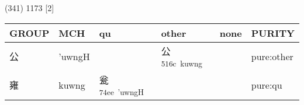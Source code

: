 \documentclass[14pt,a4paper]{scrartcl}
\begin{document}
(341) 1173 {[}2{]}

\begin{longtable}[c]{@{}llllll@{}}
\toprule
\begin{minipage}[b]{0.14\columnwidth}\raggedright\strut
GROUP
\strut\end{minipage} &
\begin{minipage}[b]{0.14\columnwidth}\raggedright\strut
MCH
\strut\end{minipage} &
\begin{minipage}[b]{0.14\columnwidth}\raggedright\strut
qu
\strut\end{minipage} &
\begin{minipage}[b]{0.14\columnwidth}\raggedright\strut
other
\strut\end{minipage} &
\begin{minipage}[b]{0.14\columnwidth}\raggedright\strut
none
\strut\end{minipage} &
\begin{minipage}[b]{0.14\columnwidth}\raggedright\strut
PURITY
\strut\end{minipage}\tabularnewline
\midrule
\endhead
\begin{minipage}[t]{0.14\columnwidth}\raggedright\strut
公
\strut\end{minipage} &
\begin{minipage}[t]{0.14\columnwidth}\raggedright\strut
'uwngH
\strut\end{minipage} &
\begin{minipage}[t]{0.14\columnwidth}\raggedright\strut
\strut\end{minipage} &
\begin{minipage}[t]{0.14\columnwidth}\raggedright\strut
公\textsuperscript{516c~kuwng}
\strut\end{minipage} &
\begin{minipage}[t]{0.14\columnwidth}\raggedright\strut
\strut\end{minipage} &
\begin{minipage}[t]{0.14\columnwidth}\raggedright\strut
pure:other
\strut\end{minipage}\tabularnewline
\begin{minipage}[t]{0.14\columnwidth}\raggedright\strut
雍
\strut\end{minipage} &
\begin{minipage}[t]{0.14\columnwidth}\raggedright\strut
kuwng
\strut\end{minipage} &
\begin{minipage}[t]{0.14\columnwidth}\raggedright\strut
瓮\textsuperscript{74ee~'uwngH}
\strut\end{minipage} &
\begin{minipage}[t]{0.14\columnwidth}\raggedright\strut
\strut\end{minipage} &
\begin{minipage}[t]{0.14\columnwidth}\raggedright\strut
\strut\end{minipage} &
\begin{minipage}[t]{0.14\columnwidth}\raggedright\strut
pure:qu
\strut\end{minipage}\tabularnewline
\bottomrule
\end{longtable}
\end{document}
